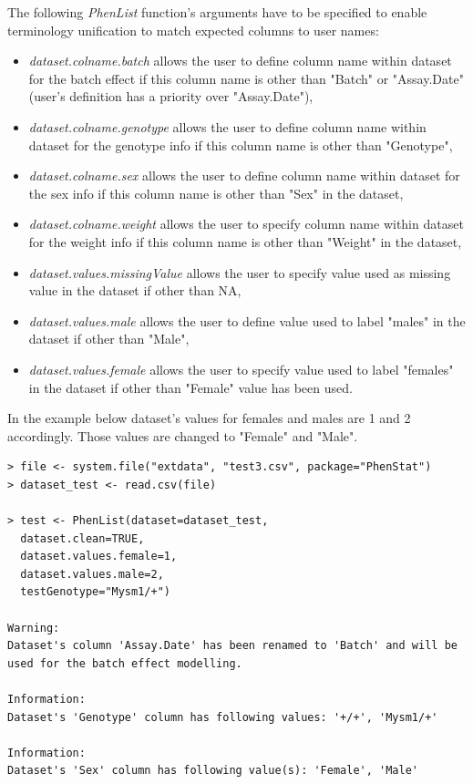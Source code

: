 \documentclass[12pt,a4paper]{article}
\begin{document}
The following \textit{PhenList} function's arguments have to be specified to enable terminology unification to match expected columns to user names:
\begin{itemize}
\item \textit{dataset.colname.batch} allows the user to define column name within dataset for the batch effect if this column name is other than "Batch" or "Assay.Date" (user's definition has a priority over "Assay.Date"), 
\item \textit{dataset.colname.genotype} allows the user to define column name within dataset for the genotype info if this column name is other than "Genotype", 
\item \textit{dataset.colname.sex} allows the user to define column name within dataset for the sex info if this column name is other than "Sex" in the dataset, 
\item \textit{dataset.colname.weight}  allows the user to specify column name within dataset for the weight info if this column name is other than "Weight" in the dataset, 
\item \textit{dataset.values.missingValue}  allows the user to specify value used as missing value in the dataset if other than NA,
\item \textit{dataset.values.male} allows the user to define value used to label "males" in the dataset if other than "Male", 
\item \textit{dataset.values.female} allows the user to specify value used to label "females" in the dataset if other than "Female" value has been used.
\end{itemize} 

In the example below dataset's values for females and males are 1 and 2 accordingly. Those values are changed to "Female" and "Male".  


\begingroup
    \fontsize{8pt}{12pt}\selectfont
\begin{verbatim}
> file <- system.file("extdata", "test3.csv", package="PhenStat") 
> dataset_test <- read.csv(file)

> test <- PhenList(dataset=dataset_test, 
  dataset.clean=TRUE, 
  dataset.values.female=1, 
  dataset.values.male=2, 
  testGenotype="Mysm1/+")

Warning:
Dataset's column 'Assay.Date' has been renamed to 'Batch' and will be used for the batch effect modelling.

Information:
Dataset's 'Genotype' column has following values: '+/+', 'Mysm1/+'

Information:
Dataset's 'Sex' column has following value(s): 'Female', 'Male'  
\end{verbatim}
\endgroup
\end{document}
